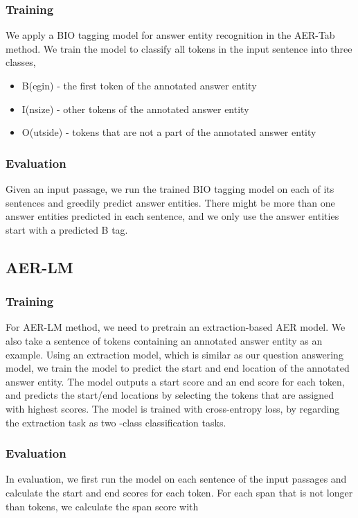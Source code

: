 \documentclass[11pt,a4paper]{article}
\begin{document}
\subsubsection{Training}
We apply a BIO tagging model for answer entity recognition in the AER-Tab method. We train the model to classify all tokens in the input sentence into three classes,
\begin{itemize}
\item B(egin) - the first token of the annotated answer entity
\item I(nsize) - other tokens of the annotated answer entity
\item O(utside) - tokens that are not a part of the annotated answer entity
\end{itemize}

\subsubsection{Evaluation}
Given an input passage, we run the trained BIO tagging model on each of its sentences and greedily predict answer entities. There might be more than one answer entities predicted in each sentence, and we only use the answer entities start with a predicted B tag.

\subsection{AER-LM}

\subsubsection{Training}
For AER-LM method, we need to pretrain an extraction-based AER model. We also take a sentence of  tokens containing an annotated answer entity as an example. Using an extraction model, which is similar as our question answering model, we train the model to predict the start and end location of the annotated answer entity. The model outputs a start score and an end score for each token, and predicts the start/end locations by selecting the tokens that are assigned with highest scores. The model is trained with cross-entropy loss, by regarding the extraction task as two -class classification tasks.

\subsubsection{Evaluation}
In evaluation, we first run the model on each sentence of the input passages and calculate the start and end scores for each token. For each span  that is not longer than  tokens, we calculate the span score with
\end{document}
